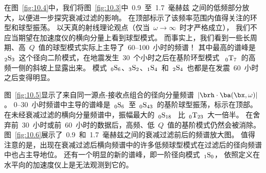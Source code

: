 在图~\ref{fig:10.4}中，我们将图~\ref{fig:10.3}中~0.9~至~1.7~毫赫兹 之间的低频部分放大，以便进一步探究衰减过滤的影响。
在顶部标示了该频率范围内值得关注的环型和球型振荡。
以天真的射线理论观点（仅当~$\omega\rightarrow\infty$~时才严格成立），
我们不应当期望在加速度仪的横向分量上看到球型模式。
而事实上，我们看到一些长周期、高~$Q$~值的球型模式实际上主导了~60--100~小时的频谱！
其中最高的谱峰是~${}_2{\rm S}_3$~这个径向二阶模式，在地震发生~30~个小时之后在基阶环型模式 ~${}_0{\rm T}_7$~的高频一侧的斜坡上显露出来。
模式~${}_0{\rm S}_6$、${}_3{\rm S}_2$、${}_1{\rm S}_4$~和~${}_2{\rm S}_4$~也都是在发震~60~小时之后变得明显。

图~\ref{fig:10.5}显示了来自同一源点-接收点组合的径向分量频谱~$|\brh\cdot\ba(\bx,\omega)|$。
0--30~小时频谱中主导的谱峰是~${}_0{\rm S}_6$~至~${}_0{\rm S}_{43}$~的基阶球型振荡，标示在顶部。
在未经衰减过滤的横向分量频谱中，振幅最大的~${}_0{\rm S}_{18}$
~比~${}_0{\rm T}_{23}$~大一倍半。
在舍弃前~30~小时或前~60~小时的数据后，高频、低~$Q$~值的基阶模式仍然会被消除。
图~\ref{fig:10.6}展示了~0.9~和~1.7~毫赫兹之间的衰减过滤前后的频谱放大图。
值得注意的是，出现在衰减过滤后横向频谱中的许多低频球型模式在过滤后的径向频谱中也占主导地位。
还有一个明显的新的谱峰，即一阶径向模式~${}_1{\rm S}_0$，
依照定义在水平向的加速度仪上是无法观测到它的。

